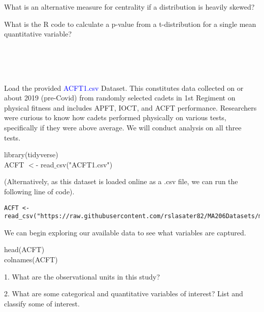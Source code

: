 \documentclass{article}
\newif\ifPrintSolution
\newcommand{\sol}[1]{\ifPrintSolution {\color{blue} #1 } \fi}
\begin{document}
\vfill

What is an alternative measure for centrality if a distribution is heavily skewed?

\sol{The Median}

\vfill

What is the R code to calculate a p-value from a t-distribution for a single mean quantitative variable?

\sol{$H_a: \mu > \; \; \; $ \color{blue} 1 - pt(t, n-1) \color{black}}\\
\sol{$H_a: \mu < \; \; \; $ \color{blue} pt(t, n-1) \color{black}}\\
\sol{$H_a: \mu \ne \; \; \; $ \color{blue} 2*(1 - pt(abs(t), n-1)) \color{black}}\\



\newpage




Load the provided \textcolor{blue}{ACFT1.csv} Dataset. This constitutes data collected on or about 2019 (pre-Covid) from randomly selected cadets in 1st Regiment on physical fitness and includes APFT, IOCT, and ACFT performance. Researchers were curious to know how cadets performed physically on various tests, specifically if they were above average. We will conduct analysis on all three tests.

\color{blue} library(tidyverse) \\
ACFT $<$- read$\_$csv("ACFT1.csv") \color{black}

(Alternatively, as this dataset is loaded online as a .csv file, we can run the following line of code).
\begin{verbatim}
ACFT <- read_csv("https://raw.githubusercontent.com/rslasater82/MA206Datasets/main/ACFT.csv")
\end{verbatim}

\vspace{0.1 in}
We can begin exploring our available data to see what variables are captured.

\color{blue} head(ACFT)\\
colnames(ACFT) \color{black}

\vspace{0.2 in}

1. What are the observational units in this study?

\sol{Each individual cadet}

\vspace{0.2in}

2. What are some categorical and quantitative variables of interest? List and classify some of interest.
\end{document}
